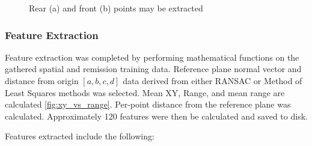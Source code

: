 \documentclass[numbered,pdftex]{ohio-etd}
\begin{document}
{{{{				\begin{figure}[H]
					
					
					
					\caption[Front and Rear Point Extraction]{Rear (a) and front (b) points may be extracted}
					
					\label{fig:points_front_rear}
					
				\end{figure}	

			} %
		
		\newpage
			
			\subsubsection{Feature Extraction}\label{sec:Feat_Extract} {
			
				{Feature extraction was completed by performing mathematical functions on the gathered spatial and remission training data. Reference plane normal vector and distance from origin $[a,b,c,d]$ data derived from either RANSAC or Method of Least Squares methods was selected. Mean XY, Range, and mean range are calculated \ref{fig:xy_vs_range}. Per-point distance from the reference plane was calculated. Approximately 120 features were then be calculated and saved to disk.}
				
				{Features extracted include the following:}

}}}}
\end{document}
